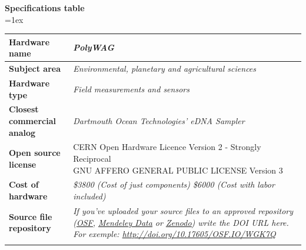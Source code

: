 \documentclass[11pt, letterpaper]{article}
\begin{document}
\begin{flushleft}
%
%
\newpage
\textbf{Specifications table}\\
\vskip 0.2cm
\tabulinesep=1ex
\begin{tabu} to \linewidth {|X[l]|X[3,l]|}
	\hline  
	\textbf{Hardware name} & 
	\textit{PolyWAG}
  	\\
  	\hline 
  	\textbf{Subject area} & 
  	\textit{Environmental, planetary and agricultural sciences}
  	\\
  	\hline 
  	\textbf{Hardware type} & 
  	\textit{Field measurements and sensors}
  	\\ 
	\hline 
	\textbf{Closest commercial analog} &
  	\textit{Dartmouth Ocean Technologies' eDNA Sampler}
  	\\
	\hline \textbf{Open source license} &
  	{CERN Open Hardware Licence Version 2 - Strongly Reciprocal \newline 
  		GNU AFFERO GENERAL PUBLIC LICENSE
                       Version 3}
  	\\
	\hline \textbf{Cost of hardware} &
  	\textit{\$3800 (Cost of just components)\newline
  		\$6000 (Cost with labor included)}
  	\\
	\hline \textbf{Source file repository} & 
  	\textit{If you’ve uploaded your source files to an approved repository (\href{http://osf.io}{\underline{OSF}}, \href{https://data.mendeley.com/}{\underline{Mendeley Data}} or \href{https://zenodo.org/}{\underline{Zenodo}}) write the DOI URL here. For exemple:  \href{http://doi.org/10.17605/OSF.IO/WGK7Q}{http://doi.org/10.17605/OSF.IO/WGK7Q}}  
  	\\
	\\\hline
\end{tabu}
\end{flushleft}
\end{document}
